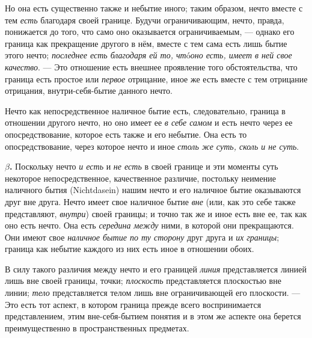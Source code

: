 Но она есть существенно также и небытие иного; таким образом, нечто вместе
с тем {\em есть} благодаря своей границе. Будучи
ограничивающим, нечто, правда, понижается до того, что само оно оказывается
ограничиваемым, — однако его граница как прекращение другого в нём, вместе
с тем сама есть лишь бытие этого нечто; {\em последнее
есть благодаря ей то, чт}ó{\em  оно есть, имеет в ней
свое качество}. — Это отношение есть внешнее проявление того
обстоятельства, что граница есть простое или
{\em первое} отрицание, иное же есть вместе с тем
отрицание отрицания, внутри-себя-бытие данного нечто.

Нечто как непосредственное наличное бытие есть, следовательно, граница в
отношении другого нечто, но оно имеет ее {\em в себе
самом} и есть нечто через ее опосредствование, которое есть также и его
небытие. Она есть то опосредствование, через которое нечто и иное
{\em столь же суть, сколь и не суть}.

{\bfseries $\beta $.} Поскольку нечто {\em и есть} и
{\em не есть} в своей границе и эти моменты суть
некоторое непосредственное, качественное различие, постольку неимение
наличного бытия (Nichtdasein) нашим нечто и его наличное бытие оказываются
друг вне друга. Нечто имеет свое наличное бытие
{\em вне} (или, как это себе также представляют,
{\em внутри}) своей границы; и точно так же и иное
есть вне ее, так как оно есть нечто. Она есть
{\em середина между} ними, в которой они прекращаются.
Они имеют свое {\em наличное бытие по ту сторону} друг
друга и {\em их границы}; граница как небытие каждого
из них есть иное в отношении обоих.

В силу такого различия между нечто и его границей
{\em линия} представляется линией лишь вне своей
границы, точки; {\em плоскость} представляется
плоскостью вне линии; {\em тело} представляется телом
лишь вне ограничивающей его плоскости. — Это есть тот аспект, в котором
граница прежде всего воспринимается представлением, этим вне-себя-бытием
понятия и в этом же аспекте она берется преимущественно в пространственных
предметах.


